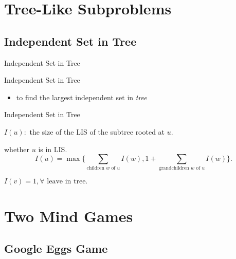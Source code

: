 \documentclass{beamer}
\begin{document}
\section{Tree-Like Subproblems}

\subsection{Independent Set in Tree}

\begin{frame}{Independent Set in Tree}
  \begin{problem}{Independent Set in Tree}
    \begin{itemize}
      \item {} to find the largest independent set in \emph{tree}
    \end{itemize}
  \end{problem}
\end{frame}
\begin{frame}{Independent Set in Tree}
  \begin{mdframed}
    $I(u):$ the size of the LIS of the subtree rooted at $u$.
  \end{mdframed}
  
  \vspace{0.30cm}
  \begin{theorem}[Recurrence]
     whether $u$ is in LIS.
      \[
        I(u) = \max \big\{
        \sum_{\textrm{children } w \textrm{ of } u} I(w),
		1 + \sum_{\textrm{grandchildren } w \textrm{ of } u} I(w) \big\}.
	  \]
  \end{theorem}
  
  \vspace{0.30cm}
   $I(v) = 1, \forall \textrm{ leave in tree.}$
\end{frame}
\section{Two Mind Games}

\subsection{Google Eggs Game}
\end{document}
